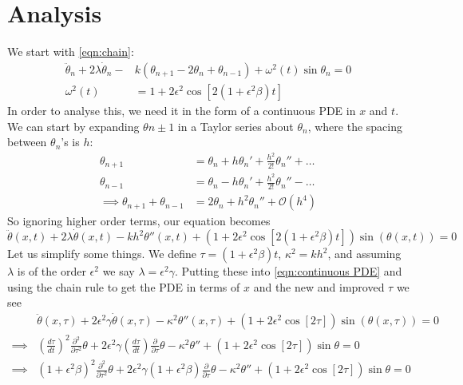 \documentclass[11pt]{article}
\numberwithin{equation}{section}
\numberwithin{figure}{section}
\numberwithin{table}{section}
\begin{document}
\section{Analysis}\label{sec:Analysis}
We start with \cref{eqn:chain}:
\begin{align*}
    \ddot\theta_n+2\lambda\dot\theta_n-&k(\theta_{n+1}-2\theta_n+\theta_{n-1})+\omega^2(t)\sin\theta_n=0\\
    \omega^2(t)&=1+2\epsilon^2\cos[2(1+\epsilon^2\beta)t]
\end{align*}
In order to analyse this, we need it in the form of a continuous PDE in $x$ and $t$. We can start by expanding $\theta{n\pm1}$ in a Taylor series about $\theta_n$, where the spacing between $\theta_n$'s is $h$:
\begin{align*}
    \theta_{n+1}&=\theta_n+h\theta_n'+\frac{h^2}{2!}\theta_n''+\dots\\
    \theta_{n-1}&=\theta_n-h\theta_n'+\frac{h^2}{2!}\theta_n''-\dots\\
    \implies \theta_{n+1}+\theta_{n-1}&=2\theta_n+h^2\theta_n''+\mathcal{O}(h^4)
\end{align*}
So ignoring higher order terms, our equation becomes
\begin{equation}
    \ddot\theta(x,t)+2\lambda\dot\theta(x,t)-kh^2\theta''(x,t)+(1+2\epsilon^2\cos[2(1+\epsilon^2\beta)t])\sin(\theta(x,t))=0
    \label{eqn:continuous PDE}
\end{equation}
Let us simplify some things. We define $\tau=(1+\epsilon^2\beta)t$, $\kappa^2=kh^2$, and assuming $\lambda$ is of the order $\epsilon^2$ we say $\lambda=\epsilon^2\gamma$. Putting these into \cref{eqn:continuous PDE} and using the chain rule to get the PDE in terms of $x$ and the new and improved $\tau$ we see
\begin{align*}
    &\ddot\theta(x,\tau)+2\epsilon^2\gamma\dot\theta(x,\tau)-\kappa^2\theta''(x,\tau)+(1+2\epsilon^2\cos[2\tau])\sin(\theta(x,\tau))=0\\
    \implies &\left(\frac{d\tau}{d t}\right)^2\frac{\partial^2}{\partial\tau^2}\theta+2\epsilon^2\gamma\left(\frac{d\tau}{d t}\right)\frac{\partial}{\partial\tau}\theta-\kappa^2\theta''+(1+2\epsilon^2\cos[2\tau])\sin\theta=0\\
    \implies &\left(1+\epsilon^2\beta\right)^2\frac{\partial^2}{\partial\tau^2}\theta+2\epsilon^2\gamma\left(1+\epsilon^2\beta\right)\frac{\partial}{\partial\tau}\theta-\kappa^2\theta''+(1+2\epsilon^2\cos[2\tau])\sin\theta=0\\
\end{align*}
\end{document}

